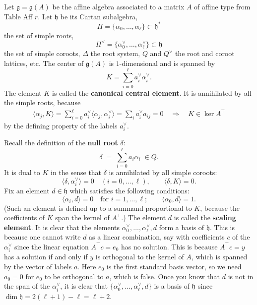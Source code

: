 \documentclass[12pt]{article}
\begin{document}
Let $\mathfrak{g} = \mathfrak{g}(A)$ be the affine algebra associated to a
matrix $A$ of affine type from Table Aff $r$. Let $\mathfrak{h}$ be its Cartan
subalgebra,
\[
    \Pi = \{\alpha_0,\dots,\alpha_\ell\} \subset \mathfrak{h}^*
\]
the set of simple roots,
\[
    \Pi^\vee = \{\alpha_0^\vee,\dots,\alpha_\ell^\vee\} \subset \mathfrak{h}
\]
the set of simple coroots, $\Delta$ the root system, $Q$ and $Q^\vee$ the
root and coroot lattices, etc. The center
of $\mathfrak{g}(A)$ is $1$-dimensional and is spanned by
\[
    K = \sum_{i=0}^\ell a_i^\vee \alpha_i^\vee.
\]
The element $K$ is called the \textbf{canonical central element}. It is annihilated by all the simple roots, because \begin{align*}
    \langle \alpha_j, K \rangle = \sum_{i=0}^\ell a_i^\vee \langle \alpha_j, \alpha_i^\vee \rangle = \sum_i a_i^\vee a_{ij} = 0
    \quad \Rightarrow \quad K \in \ker A^\top
\end{align*} by the defining property of the labels $a_i^\vee$.

Recall the definition of the \textbf{null root} $\delta$:
\[
    \delta \;=\; \sum_{i=0}^\ell a_i \alpha_i \;\in Q.
\]
It is dual to $K$ in the sense that $\delta$ is annihilated by all simple coroots:
\[
    \langle \delta, \alpha_i^\vee \rangle = 0 \quad (i=0,\dots,\ell),
    \qquad
    \langle \delta, K \rangle = 0.
\]
Fix an element $d \in \mathfrak{h}$ which satisfies the following conditions:
\[
    \langle \alpha_i, d \rangle = 0 \quad \text{for } i=1,\dots,\ell;
    \qquad
    \langle \alpha_0, d \rangle = 1.
\]
(Such an element is defined up to a summand proportional to $K$, because the coefficients of $K$ span the kernel of $A^\top$.) The element $d$ is called the \textbf{scaling element}.
It is clear that the elements $\alpha_0^\vee,\dots,\alpha_\ell^\vee,d$ form a basis of $\mathfrak{h}$. This is because one cannot write $d$ as a linear combination, say with coefficients $c$ of the $\alpha_i^\vee$ since the linear equation $A^\top c = e_0$ has no solution. This is because $A^\top c = y$ has a solution if and only if $y$ is orthogonal to the kernel of $A$, which is spanned by the vector of labels $a$. Here $e_0$ is the first standard basis vector, so we need $a_0=0$ for $e_0$ to be orthogonal to $a$, which is false. Once you know that $d$ is not in the span of the $\alpha_i^\vee$, it is clear that $\{\alpha_0^\vee,\dots,\alpha_\ell^\vee,d\}$ is a basis of $\mathfrak{h}$ since $\dim\mathfrak{h} = 2(\ell+1) - \ell = \ell+2$.
\end{document}
